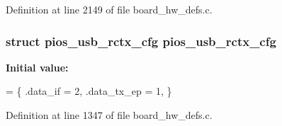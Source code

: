 Definition at line 2149 of file board\-\_\-hw\-\_\-defs.\-c.

\hypertarget{group___tau_labs_core_gaf4a39af8b0cf8dcab89860e8309804eb}{
\subsubsection[{pios\-\_\-usb\-\_\-rctx\-\_\-cfg}]{\setlength{\rightskip}{0pt plus 5cm}struct {\bf pios\-\_\-usb\-\_\-rctx\-\_\-cfg} {\bf pios\-\_\-usb\-\_\-rctx\-\_\-cfg}}}\label{group___tau_labs_core_gaf4a39af8b0cf8dcab89860e8309804eb}
{\bfseries Initial value\-:}
\begin{DoxyCode}
= \{
        .data\_if = 2,
        .data\_tx\_ep = 1,
\}
\end{DoxyCode}


Definition at line 1347 of file board\-\_\-hw\-\_\-defs.\-c.

